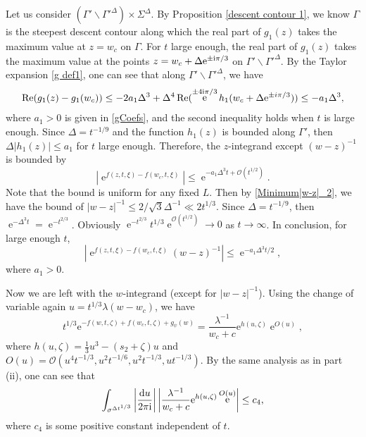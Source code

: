 \documentclass[cmp]{svjour}
\numberwithin{theorem}{section}
\numberwithin{equation}{section}
\DeclareMathOperator{\e}{e}
\def\dd{{\rm d}}
\def\ii{{\rm i}}
\def\i{{\infty}}
\begin{document}
Let us consider $(\Gamma' \backslash \Gamma'^{\Delta}) \times \Sigma^{\Delta}$. By Proposition \ref{descent contour 1}, we know $\Gamma$ is the steepest descent contour along which the real part of $g_1(z)$ takes the maximum value at $z = w_c$ on $\Gamma$. For $t$ large enough,  the real part of $g_1(z)$ takes the maximum value at the points $z = w_c + \Delta \mathrm{e}^{ \pm \ii \pi/3 }$ on $\Gamma' \backslash \Gamma'^{\Delta}$. By the Taylor expansion \eqref{g def1}, one can see that along $\Gamma' \backslash \Gamma'^{\Delta}$, we have
\begin{align*}
	\Re(g_1(z)-g_1(w_c)) \leq -2 a_1 \Delta^3 + \Delta^4 \Re(\e^{\pm 4 \ii \pi / 3} h_1(w_c + \Delta \mathrm{e}^{ \pm i \pi/3 })) 
	\leq - a_1 \Delta^3, 
\end{align*}
where $a_1>0$ is given in \eqref{gCoefs}, and the second inequality holds when $t$ is large enough. Since $\Delta = t^{-1/9}$ and the function $h_1(z)$ is bounded along $\Gamma'$, then $\Delta| h_1(z)| \leq a_1$ for $t$ large enough. Therefore, the $z$-integrand except $(w-z)^{-1}$ is bounded by
\begin{equation*}
	|\e^{f(z , t , \xi) - f(w_c , t , \xi)}|
	\leq 
	\e^{ -a_1 \Delta^3  t +\mathcal{O}(t^{1/2})}.
\end{equation*}
Note that the bound is uniform for any fixed $L$. Then by \eqref{Minimum|w-z|_2}, we have the bound of $|w-z|^{-1} \leq 2 / \sqrt{3} \Delta^{-1}  \ll 2 t^{1/3}$. Since $\Delta = t^{-1/9}$, then $\e^{-\Delta^3 t }= \e^{-t^{2/3}}$. Obviously $\e^{-t^{2/3}} t^{1/3} \e^{\mathcal{O}(t^{1/2})} \rightarrow 0$ as $t \rightarrow \i$. In conclusion, for large enough $t$, 
\begin{equation}\label{ErrorFarAway1}
	|\e^{f(z , t , \xi) - f(w_c , t , \xi)}(w-z)^{-1}|
	\leq 
	\e^{ -a_1 \Delta^3 t/2 },
\end{equation}
where $a_1>0$. 

Now we are left with the $w$-integrand (except for $|w-z|^{-1}$). Using the change of variable again $u = t^{1/3} \lambda (w - w_c)$, we have 
\begin{equation*}
	t^{1/3} \mathrm{e}^{ - f(w, t,\zeta) + f(w_c , t, \zeta) + g_{\psi}(w)}
	=\frac{\lambda^{-1}}{w_c + c}\mathrm{e}^{ h(u, \zeta)} \e^{O(u)  },
\end{equation*}
where $h(u, \zeta) =\frac{1}{3} u^3 - (s_2 + \zeta) u  $ and $O(u) = \mathcal{O}( u^4 t^{-1/3} , u^2 t^{-1/6} , u^2 t^{-1/3} , u t^{-1/3} )$. By the same analysis as in part (ii), one can see that 
\begin{equation}\label{ErrorFarAway2}
	\int_{\sigma^{\Delta t^{1/3} }} \left| \frac{\dd u}{2 \pi \ii } \right|  \left|
	\frac{\lambda^{-1}}{w_c + c}\mathrm{e}^{ h(u, \zeta)} \e^{O(u)  } \right| \leq c_4,
\end{equation}
where $c_4$ is some positive constant independent of $t$. 
\end{document}
